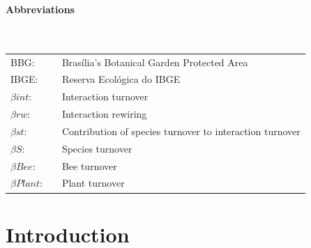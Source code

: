 \documentclass[11pt]{article}
\begin{document}
\newpage
{}
\vspace*{\fill}
\tableofcontents 
\vspace*{\fill} 
\thispagestyle{empty}

\doublespacing

\newpage 
\vspace*{\fill}
{\huge\bfseries Abbreviations} \\
\\
\\
\begin{table}[h]
\centering
\large
{}
\label{my-label}
\begin{tabular}{lll}
BBG:            &  & Bras\'ilia's Botanical Garden Protected Area             \\
IBGE:           &  & Reserva Ecol\'ogica do IBGE                              \\
$\beta{int}$:   &  & Interaction turnover                                     \\
$\beta{rw}$:    &  & Interaction rewiring                                     \\
$\beta{st}$:    &  & Contribution of species turnover to interaction turnover \\
$\beta{S}$:     &  & Species turnover                                         \\
$\beta{Bee}$:   &  & Bee turnover                                             \\
$\beta{Plant}$: &  & Plant turnover                                          
\end{tabular}
\end{table}
\vfill

\newpage
\pagestyle{fancy}
\fancyhf{}
\renewcommand{\headrulewidth}{0pt}

\section{Introduction} %
\end{document}
